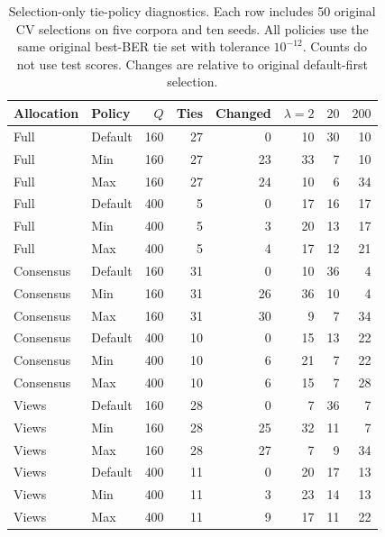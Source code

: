 \begin{table}[htbp]
\centering\small
\caption{Selection-only tie-policy diagnostics. Each row includes 50 original CV selections on five corpora and ten seeds. All policies use the same original best-BER tie set with tolerance $10^{-12}$. Counts do not use test scores. Changes are relative to original default-first selection.}\label{tab:tie-policy-selection-counts}
\begin{tabular}{llrrrrrr}\toprule
Allocation & Policy & $Q$ & Ties & Changed & $\lambda=2$ & $20$ & $200$\\\midrule
Full & Default & 160 & 27 & 0 & 10 & 30 & 10\\
Full & Min & 160 & 27 & 23 & 33 & 7 & 10\\
Full & Max & 160 & 27 & 24 & 10 & 6 & 34\\
Full & Default & 400 & 5 & 0 & 17 & 16 & 17\\
Full & Min & 400 & 5 & 3 & 20 & 13 & 17\\
Full & Max & 400 & 5 & 4 & 17 & 12 & 21\\
Consensus & Default & 160 & 31 & 0 & 10 & 36 & 4\\
Consensus & Min & 160 & 31 & 26 & 36 & 10 & 4\\
Consensus & Max & 160 & 31 & 30 & 9 & 7 & 34\\
Consensus & Default & 400 & 10 & 0 & 15 & 13 & 22\\
Consensus & Min & 400 & 10 & 6 & 21 & 7 & 22\\
Consensus & Max & 400 & 10 & 6 & 15 & 7 & 28\\
Views & Default & 160 & 28 & 0 & 7 & 36 & 7\\
Views & Min & 160 & 28 & 25 & 32 & 11 & 7\\
Views & Max & 160 & 28 & 27 & 7 & 9 & 34\\
Views & Default & 400 & 11 & 0 & 20 & 17 & 13\\
Views & Min & 400 & 11 & 3 & 23 & 14 & 13\\
Views & Max & 400 & 11 & 9 & 17 & 11 & 22\\
\bottomrule\end{tabular}
\end{table}
